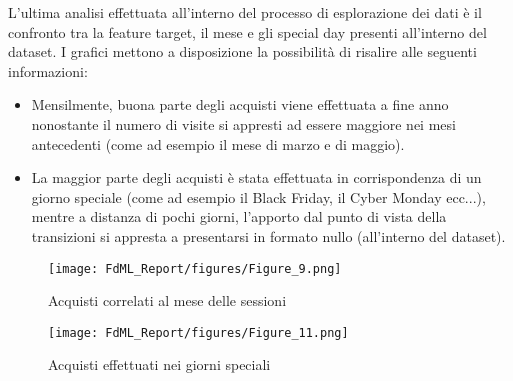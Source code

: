\documentclass[10pt,a4paper]{article}
\begin{document}
L'ultima analisi effettuata all'interno del processo di esplorazione dei dati è il confronto tra la feature target, il mese e gli special day presenti all'interno del dataset.
I grafici  mettono a disposizione la possibilità di risalire alle seguenti informazioni:
\begin{itemize}
    \item Mensilmente, buona parte degli acquisti viene effettuata a fine anno nonostante il numero di visite si appresti ad essere maggiore nei mesi antecedenti (come ad esempio il mese di marzo e di maggio).
\end{itemize}
\begin{itemize}
    \item La maggior parte degli acquisti è stata effettuata in corrispondenza di un giorno speciale (come ad esempio il Black Friday, il Cyber Monday ecc...), mentre a distanza di pochi giorni, l'apporto dal punto di vista della transizioni si appresta a presentarsi in formato nullo (all'interno del dataset).
\end{itemize}


\begin{figure}[ht]
    \centering
    \texttt{[image: FdML\_Report/figures/Figure\_9.png]}
    \caption{Acquisti correlati al mese delle sessioni}
    \label{fig:my_label}
\end{figure}

\begin{figure}[ht]
    \centering
    \texttt{[image: FdML\_Report/figures/Figure\_11.png]}
    \caption{Acquisti effettuati nei giorni speciali}
    \label{fig:my_label}
\end{figure}
\clearpage
\end{document}
